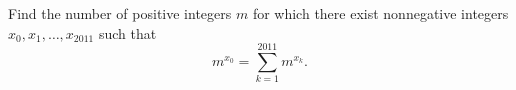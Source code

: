 Find the number of positive integers $m$ for which there exist nonnegative integers $x_0,x_1,\ldots,x_{2011}$ such that \[ m^{x_0}=\sum_{k=1}^{2011}m^{x_k}. \]